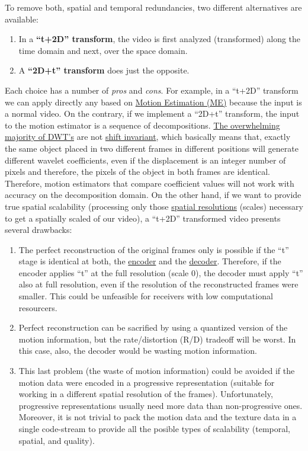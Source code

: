 To remove both, spatial and temporal redundancies, two different
alternatives are available:
\begin{enumerate}
\item In a \textbf{``t+2D'' transform}, the video is first analyzed
  (transformed) along the time domain and next, over the space domain.
\item A \textbf{``2D+t'' transform} does just the opposite.
\end{enumerate}
Each choice has a number of \emph{pros} and \emph{cons}. For example,
in a ``t+2D'' transform we can apply directly any
 based on
\href{https://en.wikipedia.org/wiki/Motion_estimation}{Motion
  Estimation (ME)} because the input is a normal video. On the
contrary, if we implement a ``2D+t'' transform, the input to the
motion estimator is a sequence of decompositions.
\href{http://www.polyvalens.com/blog/wavelets/theory}{The overwhelming
  majority of DWT's} are not
\href{http://www.polyvalens.com/blog/wavelets/theory}{shift
  invariant}, which basically means that, exactly the same object
placed in two different frames in different positions will generate
different wavelet coefficients, even if the displacement is an integer
number of pixels and therefore, the pixels of the object in both
frames are identical.  Therefore, motion estimators that compare
coefficient values will not work with accuracy on the decomposition
domain. On the other hand, if we want to provide true spatial
scalability (processing only those
\href{https://www.tutorialspoint.com/dip/spatial_resolution.htm}{spatial
  resolutions} (scales) necessary to get a spatially scaled of our
video), a ``t+2D'' transformed video presents several drawbacks:

\begin{enumerate}
\item The perfect reconstruction of the original frames only is
  possible if the ``t'' stage is identical at both, the
  \href{https://en.wikipedia.org/wiki/Encoder}{encoder} and the
  \href{https://en.wikipedia.org/wiki/Decoder}{decoder}. Therefore, if
  the encoder applies ``t'' at the full resolution (scale 0), the
  decoder must apply ``t'' also at full resolution, even if the
  resolution of the reconstructed frames were smaller. This could be
  unfeasible for receivers with low computational resourcers.
\item Perfect reconstruction can be sacrified by using a quantized
  version of the motion information, but the rate/distortion (R/D)
  tradeoff will be worst. In this case, also, the decoder would be
  wasting motion information.
\item This last problem (the waste of motion information) could be
  avoided if the motion data were encoded in a progressive
  representation (suitable for working in a different spatial
  resolution of the frames). Unfortunately, progressive
  representations usually need more data than non-progressive
  ones. Moreover, it is not trivial to pack the motion data and the
  texture data in a single code-stream to provide all the posible
  types of scalability (temporal, spatial, and quality).
\end{enumerate}

